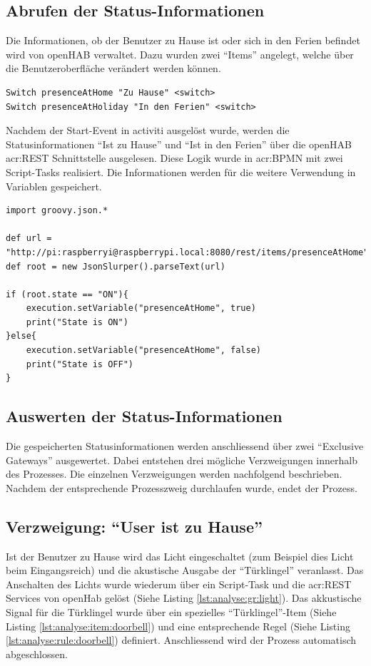 \subsection{Abrufen der Status-Informationen}
Die Informationen, ob der Benutzer zu Hause ist oder sich in den Ferien befindet wird von openHAB verwaltet. Dazu wurden zwei "`Items"' angelegt, welche über die Benutzeroberfläche verändert werden können.

\begin{lstlisting}[caption={Item-Definitionen für die An-, bzw. Abwesenheitsinformationen.}]
Switch presenceAtHome "Zu Hause" <switch>
Switch presenceAtHoliday "In den Ferien" <switch>
\end{lstlisting}

Nachdem der Start-Event in activiti ausgelöst wurde, werden die Statusinformationen "`Ist zu Hause"' und "`Ist in den Ferien"' über die openHAB \gls{acr:REST} Schnittstelle ausgelesen. Diese Logik wurde in \gls{acr:BPMN} mit zwei Script-Tasks realisiert. Die Informationen werden für die weitere Verwendung in Variablen gespeichert.

\begin{lstlisting}[caption={Grovvy Script zum Auslesen der Information "`Ist zu Hause"'.}]
import groovy.json.*
 
def url = "http://pi:raspberryi@raspberrypi.local:8080/rest/items/presenceAtHome".toURL().text
def root = new JsonSlurper().parseText(url)
 
if (root.state == "ON"){
	execution.setVariable("presenceAtHome", true)
	print("State is ON")
}else{
	execution.setVariable("presenceAtHome", false)
	print("State is OFF")
}
\end{lstlisting}

\subsection{Auswerten der Status-Informationen}
Die gespeicherten Statusinformationen werden anschliessend über zwei "`Exclusive Gateways"' ausgewertet. Dabei entstehen drei mögliche Verzweigungen innerhalb des Prozesses. Die einzelnen Verzweigungen werden nachfolgend beschrieben. Nachdem der entsprechende Prozesszweig durchlaufen wurde, endet der Prozess.

\subsection{Verzweigung: "`User ist zu Hause"'}
Ist der Benutzer zu Hause wird das Licht eingeschaltet (zum Beispiel dies Licht beim Eingangsreich) und die akustische Ausgabe der "`Türklingel"' veranlasst. Das Anschalten des Lichts wurde wiederum über ein Script-Task und die \gls{acr:REST} Services von openHab gelöst (Siehe Listing \ref{lst:analyse:gr:light}). Das akkustische Signal für die Türklingel wurde über ein spezielles "`Türklingel"'-Item (Siehe Listing \ref{lst:analyse:item:doorbell}) und eine entsprechende Regel (Siehe Listing \ref{lst:analyse:rule:doorbell}) definiert. Anschliessend wird der Prozess automatisch abgeschlossen.

